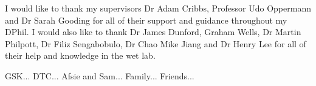 I would like to thank my supervisors Dr Adam Cribbs, Professor Udo Oppermann and Dr Sarah Gooding for all of their support and guidance throughout my DPhil.
I would also like to thank Dr James Dunford, Graham Wells, Dr Martin Philpott, Dr Filiz Sengabobulo, Dr Chao Mike Jiang and Dr Henry Lee for all of their help and knowledge in the wet lab.

GSK...
DTC...
Afsie and Sam...
Family...
Friends...

